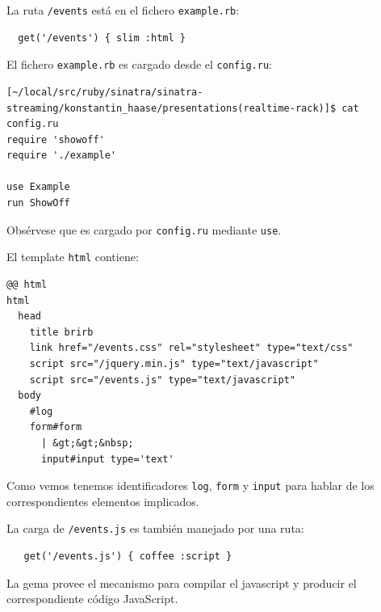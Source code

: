 La ruta \verb|/events|
está en el fichero \verb|example.rb|:
\begin{verbatim}
  get('/events') { slim :html }
\end{verbatim}

El fichero \verb|example.rb| es cargado desde el \verb|config.ru|:
\begin{verbatim}
[~/local/src/ruby/sinatra/sinatra-streaming/konstantin_haase/presentations(realtime-rack)]$ cat config.ru 
require 'showoff'
require './example'

use Example
run ShowOff
\end{verbatim}
Obsérvese que es cargado por \verb|config.ru| mediante \verb|use|.

El template \verb|html| contiene:
\begin{verbatim}
@@ html
html
  head
    title brirb
    link href="/events.css" rel="stylesheet" type="text/css"
    script src="/jquery.min.js" type="text/javascript"
    script src="/events.js" type="text/javascript"
  body
    #log
    form#form
      | &gt;&gt;&nbsp;
      input#input type='text'

\end{verbatim}
Como vemos tenemos identificadores \verb|log|, \verb|form| y \verb|input| para hablar
de los correspondientes elementos implicados.

La carga de \verb|/events.js| es también manejado por una ruta:

\begin{verbatim}
   get('/events.js') { coffee :script }
\end{verbatim}
La gema 
provee el mecanismo para compilar el javascript y producir el correspondiente
código JavaScript.

